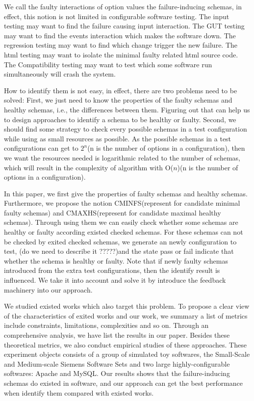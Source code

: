 \documentclass[10pt,journal,cspaper,compsoc]{IEEEtran}
\begin{document}
We call the faulty interactions of option values the failure-inducing schemas, in effect, this notion is not limited in configurable software testing. The input testing may want to find the failure causing input interaction. The GUT testing may want to find the events interaction which makes the software down. The regression testing may want to find which change trigger the new failure. The html testing may want to isolate the minimal faulty related html source code. The Compatibility testing may want to test which some software run simultaneously will crash the system.

How to identify them is not easy, in effect, there are two problems need to be solved: First, we just need to know the properties of the faulty schemas and healthy schemas, i.e., the differences between them. Figuring out that can help us to design approaches to identify a schema to be healthy or faulty. Second, we should find some strategy to check every possible schemas in a test configuration while using as small resources as possible. As the possible schemas in a test configurations can get to $2^n$(n is the number of options in a configuration), then we want the resources needed is logarithmic related to the number of schemas, which will result in the complexity of algorithm with O($n$)(n is the number of options in a configuration).

In this paper, we first give the properties of faulty schemas and healthy schemas. Furthermore, we propose the notion CMINFS(represent for candidate minimal faulty schemas) and CMAXHS(represent for candidate maximal healthy schemas). Through using them we can easily check whether some schemas are healthy or faulty according existed checked schemas. For these schemas can not be checked by exited checked schemas, we generate an newly configuration to test, (do we need to describe  it ?????)and the state pass or fail indicate that whether the schema is healthy or faulty. Note that if newly faulty schemas introduced from the extra test configurations, then the identify result is influenced. We take it into account and solve it by introduce the feedback machinery into our approach.

We studied existed works which also target this problem. To propose a clear view of the characteristics of exited works and our work, we  summary a list of metrics include constraints, limitations, complexities and so on. Through an comprehensive analysis, we have list the results in our paper. Besides these theoretical metrics, we also conduct empirical studies of these approaches. These experiment objects consists of a group of simulated toy softwares, the Small-Scale and Medium-scale Siemens Software Sets and two large highly-configurable softwares: Apache and MySQL. Our results shows that the failure-inducing schemas do existed in software, and our approach can get the best performance when identify them compared with existed works.
\end{document}
